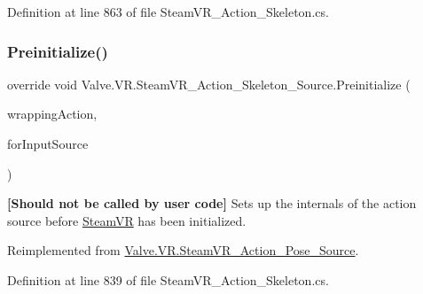Definition at line 863 of file Steam\+V\+R\+\_\+\+Action\+\_\+\+Skeleton.\+cs.

\mbox{\label{class_valve_1_1_v_r_1_1_steam_v_r___action___skeleton___source_a8341927740ab2699476e66d08d3124d3}} 
\subsubsection{\texorpdfstring{Preinitialize()}{Preinitialize()}}
{\footnotesize\ttfamily override void Valve.\+V\+R.\+Steam\+V\+R\+\_\+\+Action\+\_\+\+Skeleton\+\_\+\+Source.\+Preinitialize (\begin{DoxyParamCaption}\item[{\mbox{\hyperlink{class_valve_1_1_v_r_1_1_steam_v_r___action}{Steam\+V\+R\+\_\+\+Action}}}]{wrapping\+Action,  }\item[{\mbox{\hyperlink{namespace_valve_1_1_v_r_a82e5bf501cc3aa155444ee3f0662853f}{Steam\+V\+R\+\_\+\+Input\+\_\+\+Sources}}}]{for\+Input\+Source }\end{DoxyParamCaption})\hspace{0.3cm}{\ttfamily [virtual]}}



{\bfseries{\mbox{[}Should not be called by user code\mbox{]}}} Sets up the internals of the action source before \mbox{\hyperlink{class_valve_1_1_v_r_1_1_steam_v_r}{Steam\+VR}} has been initialized. 



Reimplemented from \mbox{\hyperlink{class_valve_1_1_v_r_1_1_steam_v_r___action___pose___source_a2e4aacdbfb9d1a2c5edffcd42e2c3c0e}{Valve.\+V\+R.\+Steam\+V\+R\+\_\+\+Action\+\_\+\+Pose\+\_\+\+Source}}.



Definition at line 839 of file Steam\+V\+R\+\_\+\+Action\+\_\+\+Skeleton.\+cs.

\mbox{\label{class_valve_1_1_v_r_1_1_steam_v_r___action___skeleton___source_ab6af87a8b749735903ba744c168f7baa}} 
